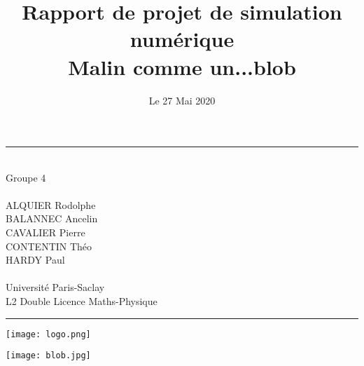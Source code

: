 \documentclass{article}
\date{Le 27 Mai 2020}
\begin{document}
\newpage

\title{\Huge{Rapport de projet de simulation numérique \\ \textbf{Malin comme un...blob\\}
}}
\vspace{0.5cm}


\maketitle


\begin{center}
    \rule{0.9\linewidth}{0.5pt}\\
        \vspace{5mm}
        Groupe 4\\ 
        \ \\
	    ALQUIER Rodolphe\\
      BALANNEC Ancelin\\
      CAVALIER Pierre\\
      CONTENTIN Théo\\
      HARDY Paul\\
	    \ \\
		Université Paris-Saclay\\
		L2 Double Licence Maths-Physique\\
        \vspace{5mm}	
\rule{0.9\linewidth}{0.5pt}
\vspace{0.5cm}
\end{center}

\begin{center}
\begin{minipage}{.5\textwidth}%
  \centerline{\texttt{[image: logo.png]}}


\end{minipage}%
\hfill
\begin{minipage}{.5\textwidth}%
\texttt{[image: blob.jpg]}
\end{minipage}
\end{center}
\end{document}
